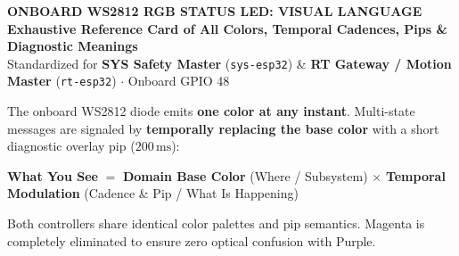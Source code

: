 \documentclass[10pt,a4paper]{article}
\begin{document}

\begin{center}
  {\Large\textbf{ONBOARD WS2812 RGB STATUS LED: VISUAL LANGUAGE}}\\[1.2mm]
  {\small\textbf{Exhaustive Reference Card of All Colors, Temporal Cadences, Pips \& Diagnostic Meanings}}\\[0.8mm]
  {\footnotesize Standardized for \textbf{SYS Safety Master} (\texttt{sys-esp32}) \& \textbf{RT Gateway / Motion Master} (\texttt{rt-esp32}) $\cdot$ Onboard GPIO 48}
\end{center}

\vspace{-1.5mm}

\begin{tcolorbox}[sectionbox, title=1. Visual Grammar: Domain Color $\times$ Temporal Modulation]
The onboard WS2812 diode emits \textbf{one color at any instant}. Multi-state messages are signaled by \textbf{temporally replacing the base color} with a short diagnostic overlay pip ($200\,\text{ms}$):
\begin{center}
\textbf{What You See} $=$ \textbf{Domain Base Color} (Where / Subsystem) $\times$ \textbf{Temporal Modulation} (Cadence \& Pip / What Is Happening)
\end{center}
Both controllers share identical color palettes and pip semantics. Magenta is completely eliminated to ensure zero optical confusion with Purple.
\end{tcolorbox}

\vspace{-1mm}
\end{document}
